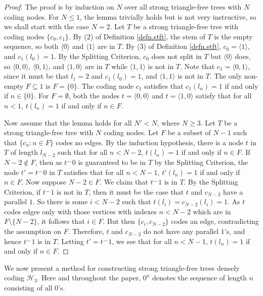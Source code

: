 \documentclass{amsart}
\theoremstyle{remark}
\theoremstyle{definition}
\theoremstyle{remark}
\newcommand{\sse}{\subseteq}
\newcommand{\lgl}{\langle}
\newcommand{\rgl}{\rangle}
\begin{document}
\begin{proof}
The proof is by induction on $N$ over all strong triangle-free trees with $N$ coding nodes.
For $N\le 1$,
the lemma trivially holds but is not very instructive,
so we  shall start with  the case $N=2$.
Let $T$ be a strong triangle-free tree with coding nodes $\{ c_0,c_1 \}$.
By (2) of Definition \ref{defn.stft},
the stem of $T$ is the empty sequence,
so both $\lgl 0\rgl$ and $\lgl 1\rgl$ are in $T$.
By (3) of Definition \ref{defn.stft},
$c_0=\lgl 1\rgl$,
and $c_1(l_0)=1$.
By the Splitting Criterion,  $c_0$ does not split in $T$ but $\lgl 0\rgl$ does,
so $\lgl 0,0\rgl$, $\lgl 0,1\rgl$,  and $\lgl 1,0\rgl$ are in $T$  while $\lgl 1,1\rgl$ is not in $T$.
Note that $c_1=\lgl 0,1\rgl$, since  it must be that
$l_1=2$ and
 $c_1(l_0)=1$,
and $\lgl 1,1\rgl$ is not in $T$.
The only non-empty $F\sse 1$ is $F=\{0\}$.
The coding node $c_1$ satisfies that $c_1(l_n)=1$ if and only if $n\in \{0\}$.
For $F=\emptyset$,
both the nodes $t=\lgl 0,0 \rgl$ and $t=\lgl 1,0\rgl$ satisfy
that for all $n<1$, $t(l_n)=1$  if and only if $n\in F$.



Now assume that the lemma holds for all $N'<N$, where $N\ge 3$.
Let $T$ be a strong triangle-free tree with $N$ coding nodes.
Let $F$ be a subset of $N-1$ such that $\{c_n:n\in F\}$ codes no edges.
By the induction hypothesis, there is a node $t$ in $T$ of length $l_{N-2}$ such that
for all $n<N-2$, $t(l_n)=1$ if and only if $n\in F$.
If  $N-2\not\in F$,
then
as $t^{\frown}0$ is guaranteed to be in $T$
by the Splitting Criterion,
the  node $t'=t^{\frown}0$ in $T$  satisfies that
 for all $n<N-1$,
$t'(l_n)=1$ if and only if $n\in F$.
Now  suppose $N-2\in F$.
We claim that $t^{\frown}1$ is in $T$.
By the Splitting Criterion,
if  $t^{\frown}1$ is not in $T$,
then it must be the case that $t$ and $c_{N-2}$ have a parallel $1$.
So there is some $i<N-2$ such that $t(l_i)=c_{N-2}(l_i)=1$.
As $t$ codes edges only with those vertices with indexes  $n<N-2$ which are in $F\setminus\{N-2\}$,
it follows that $i\in F$.
But then $\{c_i,c_{N-2}\}$ codes an edge, contradicting the assumption on $F$.
Therefore, $t$ and $c_{N-2}$ do not have any parallel $1$'s,
and hence $t^{\frown}1$ is in $T$.
Letting $t'=t^{\frown}1$,
we see that for all $n<N-1$,
$t(l_n)=1$ if and only if $n\in F$.
\end{proof}




We now present a  method for constructing   strong triangle-free trees densely coding $\mathcal{H}_3$.
Here and throughout the paper, $0^n$ denotes the sequence of length $n$ consisting of all $0$'s.
\end{document}
